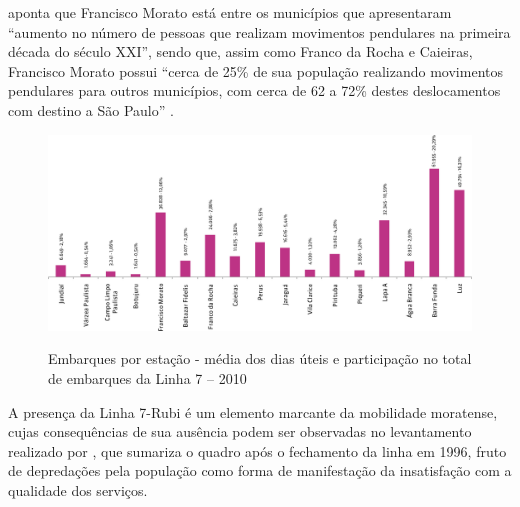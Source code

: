 	 aponta que Francisco Morato está entre os municípios que apresentaram ``aumento no número de
	pessoas que realizam movimentos pendulares na primeira década do século XXI'', sendo que, assim como Franco da Rocha e Caieiras, Francisco Morato possui ``cerca de 25\% de sua população realizando movimentos pendulares para outros municípios, com cerca de 62 a 72\% destes deslocamentos com destino a São Paulo'' \cite[p.72]{suarez2014a}.
	
	\begin{figure}[!htb]
		\centering
		\caption[Embarques por estação da Linha 7 - 2010]{Embarques por estação - média dos dias úteis e participação no total de embarques da Linha 7 – 2010}
		\includegraphics[width=\linewidth]{img/pdcptm_57a}
		\label{fig:pdcptm_57a}
	\end{figure}
    
    A presença da Linha 7-Rubi é um elemento marcante da mobilidade moratense, cujas consequências de sua ausência podem ser observadas no levantamento realizado por \cite[p.32-33]{ferreira2010a}, que sumariza o quadro após o fechamento da linha em 1996, fruto de depredações pela população como forma de manifestação da insatisfação com a qualidade dos serviços.
    
